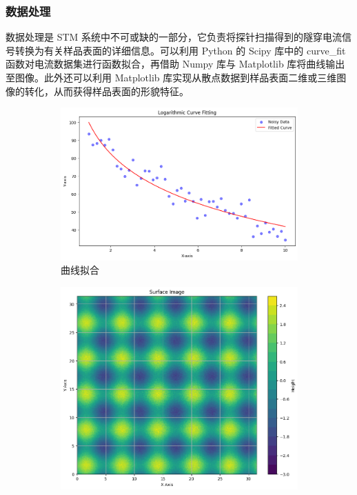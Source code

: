 \documentclass[zihao=-4]{ctexart}
\begin{document}
\begin{spacing}{1.5}
		
		
		
		\subsubsection{数据处理}
			数据处理是 STM 系统中不可或缺的一部分，它负责将探针扫描得到的隧穿电流信号转换为有关样品表面的详细信息。可以利用 Python 的 Scipy 库中的 curve\_fit 函数对电流数据集进行函数拟合，再借助 Numpy 库与 Matplotlib 库将曲线输出至图像。此外还可以利用 Matplotlib 库实现从散点数据到样品表面二维或三维图像的转化，从而获得样品表面的形貌特征。
			
			\begin{figure}[!h]
				\centering
				\begin{subfigure}{0.3\textwidth}
					\centering
					\includegraphics[width=\textwidth]{5.png}
					\caption{曲线拟合}
				\end{subfigure}
				\hfill
				\begin{subfigure}{0.3\textwidth}
					\centering
					\includegraphics[width=\textwidth]{3.png}

\end{subfigure}
\end{figure}
\end{spacing}
\end{document}
